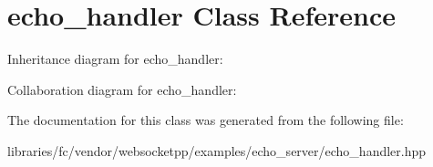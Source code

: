 \hypertarget{classecho__handler}{}\section{echo\+\_\+handler Class Reference}
\label{classecho__handler}


Inheritance diagram for echo\+\_\+handler\+:


Collaboration diagram for echo\+\_\+handler\+:


The documentation for this class was generated from the following file\+:\begin{DoxyCompactItemize}
\item 
libraries/fc/vendor/websocketpp/examples/echo\+\_\+server/echo\+\_\+handler.\+hpp\end{DoxyCompactItemize}
